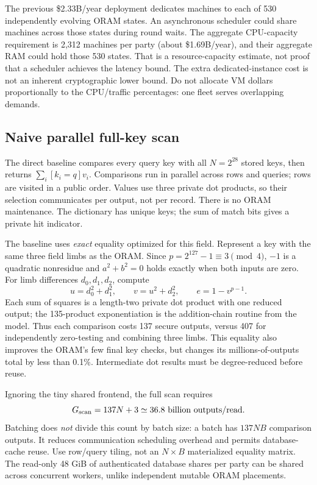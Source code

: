 The previous \$2.33B/year deployment dedicates machines to each of 530 independently
evolving ORAM states. An asynchronous scheduler could share machines across those
states during round waits. The aggregate CPU-capacity requirement is 2,312 machines
per party (about \$1.69B/year), and their aggregate RAM could hold those 530 states.
That is a resource-capacity estimate, not proof that a scheduler achieves the
latency bound. The extra dedicated-instance cost is not an inherent cryptographic
lower bound. Do not allocate VM dollars proportionally to the CPU/traffic percentages:
one fleet serves overlapping demands.

\subsection{Naive parallel full-key scan}
The direct baseline compares every query key with all $N=2^{28}$ stored keys,
then returns $\sum_i [k_i=q]v_i$. Comparisons run in parallel across rows and queries;
rows are visited in a public order. Values use three private dot products, so their
selection communicates per output, not per record. There is no ORAM maintenance.
The dictionary has unique keys; the sum of match bits gives a private hit indicator.

The baseline uses \emph{exact} equality optimized for this field.
Represent a key with the same three field limbs as the ORAM. Since
$p=2^{127}-1\equiv3\pmod4$, $-1$ is a quadratic nonresidue and
$a^2+b^2=0$ holds exactly when both inputs are zero. For limb differences $d_0,d_1,d_2$,
compute
\[
 u=d_0^2+d_1^2,\qquad v=u^2+d_2^2,\qquad e=1-v^{p-1}.
\]
Each sum of squares is a length-two private dot product with one reduced output;
the 135-product exponentiation is the addition-chain routine from the model.
Thus each comparison costs 137 secure outputs, versus 407 for independently
zero-testing and combining three limbs. This equality also improves the ORAM's
few final key checks, but changes its millions-of-outputs total by less than 0.1\%.
Intermediate dot results must be degree-reduced before reuse.

Ignoring the tiny shared frontend, the full scan requires
\[
 G_{\rm scan}=137N+3\simeq36.8\ \text{billion outputs/read}.
\]
Batching does \emph{not} divide this count by batch size: a batch has $137NB$
comparison outputs. It reduces communication scheduling overhead and permits
database-cache reuse. Use row/query tiling, not an $N\times B$ materialized equality
matrix. The read-only 48 GiB of authenticated database shares per party can be shared
across concurrent workers, unlike independent mutable ORAM placements.

